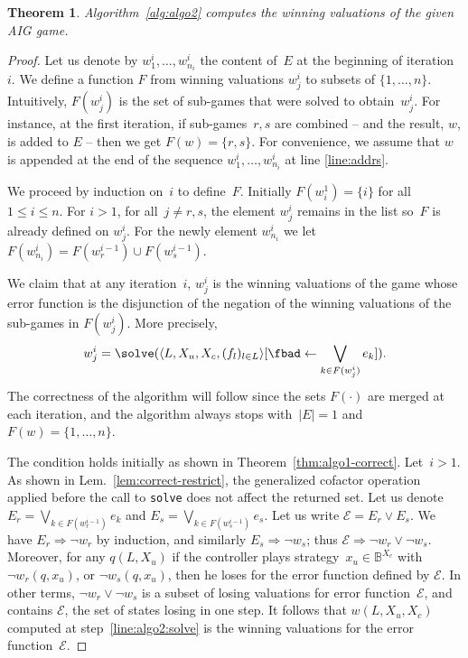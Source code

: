 \documentclass[submission,copyright,creativecommons]{eptcs}
\newtheorem{theorem}{Theorem}
\begin{document}
\begin{theorem}\label{thm:algo2-correct}
  Algorithm~\ref{alg:algo2} computes the winning valuations of the given AIG game.
\end{theorem}	
\begin{proof}
Let us denote by $w^i_1, \dots, w^i_{n_i}$ the content of~$E$ at the beginning
of iteration~$i$.  We define a function $F$ from winning valuations $w^i_j$
to subsets of $\{1,\ldots,n\}$.  Intuitively, $F(w^i_j)$ is the set of sub-games
that were solved to obtain~$w^i_j$. For instance, at the first iteration, if
sub-games~$r,s$ are combined -- and the result, $w$, is added to $E$ -- then we
get $F( w ) = \{r,s\}$. For convenience, we assume that $w$ is appended at the
end of the sequence $w^i_1, \dots, w^i_{n_i}$ at line \ref{line:addrs}.

We proceed by induction on~$i$ to define~$F$.  Initially $F( w_i^1 ) =
\{ i \}$ for all~$1\leq i \leq n$.  For $i>1$, for all~$j \neq r,s$, the
element $w^i_j$ remains in the list so~$F$ is already defined on $w^i_j$.
For the newly element $w^i_{n_i}$ we let $F( w^i_{n_i} ) =
F( w^{i-1}_r ) \cup F(w^{i-1}_s)$.

We claim that at any iteration~$i$, $w^i_j$ is the winning valuations of the game
whose error function is the disjunction of the negation of the
winning valuations of the sub-games in $F(w_j^i)$. More precisely,
\[
	w_j^i = \solve(\langle L, X_u, X_c,(f_l)_{l \in L}\rangle[\fbad \leftarrow
	\bigvee_{k \in F(w^i_j)} e_k]).
\]
The correctness of the algorithm will follow since the sets $F(\cdot)$ are
merged at each iteration, and the algorithm always stops with~$|E|=1$ and $F(w)
= \{1,\ldots,n\}$.

The condition holds initially as shown in Theorem~\ref{thm:algo1-correct}.
Let~$i>1$.  As shown in Lem.~\ref{lem:correct-restrict}, the generalized
cofactor operation applied before the call to \texttt{solve} does not affect the
returned set.  Let us denote $E_r = \bigvee_{k \in F(w^{i-1}_r)} e_k$ and $E_s =
\bigvee_{k \in F(w^{i-1}_s)} e_s$.  Let us write $\mathcal{E}= E_r \lor E_s$.
We have $E_r \Rightarrow \lnot w_r$ by induction, and similarly $E_s \Rightarrow
\lnot w_s$; thus $\mathcal{E} \Rightarrow \lnot w_r \lor \lnot w_s$.  Moreover,
for any $q(L,X_u)$ if the controller plays strategy~$x_u \in \mathbb{B}^{X_c}$
with $\lnot w_r(q,x_u)$, or $\lnot w_s(q,x_u)$, then he loses for the error
function defined by $\mathcal{E}$. In other terms, $\lnot w_r \lor \lnot w_s$ is
a subset of losing valuations for error function~$\mathcal{E}$, and contains
$\mathcal{E}$, the set of states losing in one step.  It follows that
$w(L,X_u,X_c)$ computed at step~\ref{line:algo2:solve} is the winning valuations for
the error function~$\mathcal{E}$.
\end{proof}
\end{document}
